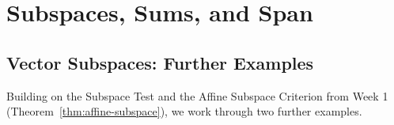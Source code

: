\documentclass[11pt, a4paper, notitlepage]{report}
\theoremstyle{definition}
\theoremstyle{remark}
\begin{document}
\chapter{Subspaces, Sums, and Span}
\label{chap:week2}

\section{Vector Subspaces: Further Examples}
\label{sec:subspaces-week2}

Building on the Subspace Test and the Affine Subspace Criterion from Week 1 (Theorem~\ref{thm:affine-subspace}), we work through two further examples.
\end{document}

